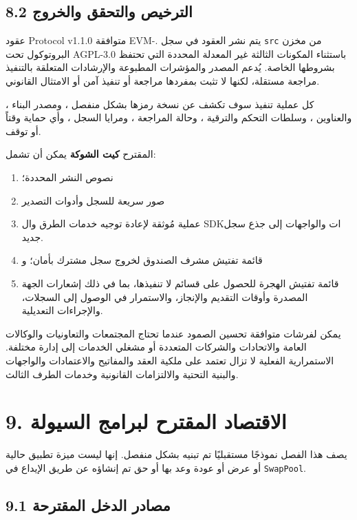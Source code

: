 \documentclass[11pt]{article}
\begin{document}
\subsection*{8.2 الترخيص والتحقق والخروج}

عقود Protocol v1.1.0 متوافقة EVM-. يتم نشر العقود في سجل \texttt{src} من مخزن البروتوكول تحت AGPL-3.0 باستثناء المكونات الثالثة غير المعدلة المحددة التي تحتفظ بشروطها الخاصة. يُدعم المصدر والمؤشرات المطبوعة والإرشادات المتعلقة بالتنفيذ مراجعة مستقلة، لكنها لا تثبت بمفردها مراجعة أو تنفيذ آمن أو الامتثال القانوني.

كل عملية تنفيذ سوف تكشف عن نسخة رمزها بشكل منفصل ، ومصدر البناء ، والعناوين ، وسلطات التحكم والترقية ، وحالة المراجعة ، ومرايا السجل ، وأي حماية وقتاً أو توقف.

المقترح \textbf{كيت الشوكة} يمكن أن تشمل:

\begin{enumerate}[leftmargin=*]
\item نصوص النشر المحددة؛
\item صور سريعة للسجل وأدوات التصدير
\item عملية مُوثقة لإعادة توجيه خدمات الطرق وال SDKات والواجهات إلى جذع سجل جديد.
\item قائمة تفتيش مشرف الصندوق لخروج سجل مشترك بأمان؛ و
\item قائمة تفتيش الهجرة للحصول على قسائم لا تنفيذها، بما في ذلك إشعارات الجهة المصدرة وأوقات التقديم والإنجاز، والاستمرار في الوصول إلى السجلات، والإجراءات التعديلية.
\end{enumerate}
يمكن لفرشات متوافقة تحسين الصمود عندما تحتاج المجتمعات والتعاونيات والوكالات العامة والاتحادات والشركات المتعددة أو مشغلي الخدمات إلى إدارة مختلفة. الاستمرارية الفعلية لا تزال تعتمد على ملكية العقد والمفاتيح والاعتمادات والواجهات والبنية التحتية والالتزامات القانونية وخدمات الطرف الثالث.


\section*{9. الاقتصاد المقترح لبرامج السيولة}

يصف هذا الفصل نموذجًا مستقبليًا تم تبنيه بشكل منفصل. إنها ليست ميزة تطبيق حالية أو عرض أو عودة وعد بها أو حق تم إنشاؤه عن طريق الإيداع في \texttt{SwapPool}.

\subsection*{9.1 مصادر الدخل المقترحة}
\end{document}
